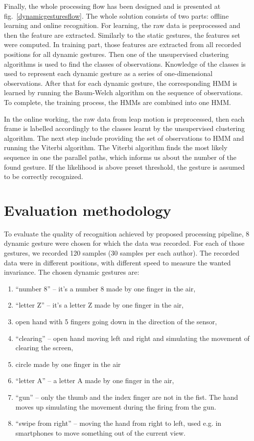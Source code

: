 Finally, the whole processing flow has been designed and is presented at fig.~\ref{dynamicgesturesflow}.
The whole solution consists of two parts: offline learning and online recognition.
For learning, the raw data is preprocessed and then the feature are extracted. 
Similarly to the static gestures, the features set were computed. 
In training part, those features are extracted from all recorded positions for all dynamic gestures.
Then one of the unsupervised clustering algorithms is used to find the classes of observations.
Knowledge of the classes is used to represent each dynamic gesture as a series of one-dimensional observations.
After that for each dynamic gesture, the corresponding HMM is learned by running the Baum-Welch algorithm on the sequence of observations.
To complete, the training process, the HMMs are combined into one HMM.

In the online working, the raw data from leap motion is preprocessed, then each frame is labelled accordingly to the classes learnt by the unsupervised clustering algorithm.
The next step include providing the set of observations to HMM and running the Viterbi algorithm.
The Viterbi algorithm finds the most likely sequence in one the parallel paths, which informs us about the number of the found gesture. 
If the likelihood is above preset threshold, the gesture is assumed to be correctly recognized.


\section{Evaluation methodology}

To evaluate the quality of recognition achieved by proposed processing pipeline, 8 dynamic gesture were chosen for which the data was recorded.
For each of those gestures, we recorded 120 samples (30 samples per each author).
The recorded data were in different positions, with different speed to measure the wanted invariance.
The chosen dynamic gestures are:
\begin{enumerate}
\item ``number 8'' -- it's a number 8 made by one finger in the air,
\item ``letter Z'' -- it's a letter Z made by one finger in the air,
\item open hand with 5 fingers going down in the direction of the sensor,
\item ``clearing'' -- open hand moving left and right and simulating the movement of clearing the screen,
\item circle made by one finger in the air
\item ``letter A'' -- a letter A made by one finger in the air,
\item ``gun'' -- only the thumb and the index finger are not in the fist. The hand moves up simulating the movement during the firing from the gun.
\item ``swipe from right'' -- moving the hand from right to left, used e.g. in smartphones to move something out of the current view.
\end{enumerate}

